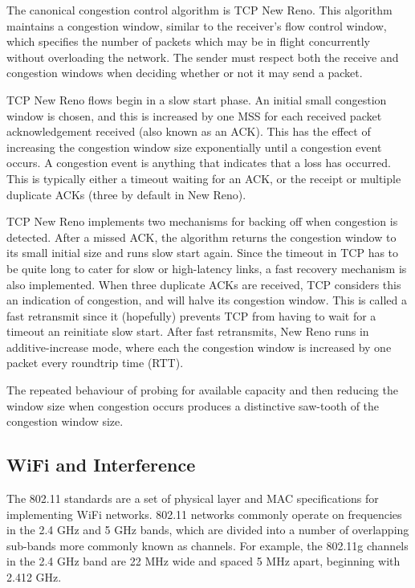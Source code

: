 The canonical congestion control algorithm is TCP New Reno. This algorithm
maintains a congestion window, similar to the receiver's flow control window,
which specifies the number of packets which may be in flight concurrently
without overloading the network. The sender must respect both the receive and
congestion windows when deciding whether or not it may send a packet.

TCP New Reno flows begin in a slow start phase. An initial small congestion
window is chosen, and this is increased by one MSS for each received packet
acknowledgement received (also known as an ACK). This has the effect of
increasing the congestion window size exponentially until a congestion event
occurs. A congestion event is anything that indicates that a loss has occurred.
This is typically either a timeout waiting for an ACK, or the receipt or
multiple duplicate ACKs (three by default in New Reno).

TCP New Reno implements two mechanisms for backing off when congestion is
detected. After a missed ACK, the algorithm returns the congestion window to its
small initial size and runs slow start again. Since the timeout in TCP has to be
quite long to cater for slow or high-latency links, a fast recovery mechanism is
also implemented. When three duplicate ACKs are received, TCP considers this an
indication of congestion, and will halve its congestion window. This is called a
fast retransmit since it (hopefully) prevents TCP from having to wait for a
timeout an reinitiate slow start. After fast retransmits, New Reno runs in
additive-increase mode, where each the congestion window is increased by one
packet every roundtrip time (RTT).

The repeated behaviour of probing for available capacity and then reducing the
window size when congestion occurs produces a distinctive saw-tooth of the
congestion window size.

\subsection{WiFi and Interference}
\label{sec:bg:wifi}
The 802.11 standards are a set of physical layer and MAC specifications for
implementing WiFi networks. 802.11 networks commonly operate on frequencies in
the 2.4 GHz and 5 GHz bands, which are divided into a number of overlapping
sub-bands more commonly known as channels. For example, the 802.11g channels in
the 2.4 GHz band are 22 MHz wide and spaced 5 MHz apart, beginning with 2.412
GHz.

